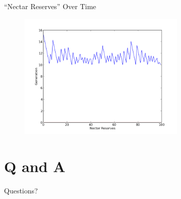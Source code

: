 \documentclass{beamer}
\begin{document}
    \begin{frame}{``Nectar Reserves'' Over Time}
        \begin{figure}
        \includegraphics[width=8cm]{hive_influenced_bees_nectar.png}
        \end{figure}
    \end{frame}


    \section{Q and A}
    \begin{frame}{Questions?}
        \titlepage
    \end{frame}
\end{document}
